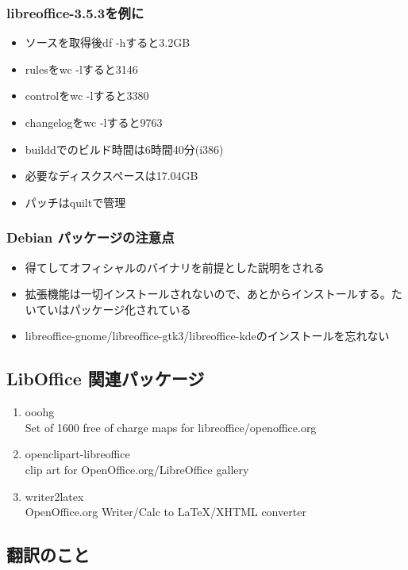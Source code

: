 \documentclass[mingoth,a4paper]{jsarticle}
\begin{document}
\subsubsection{libreoffice-3.5.3を例に}

\begin{itemize}
\item ソースを取得後df -hすると3.2GB
\item rulesをwc -lすると3146
\item controlをwc -lすると3380
\item changelogをwc -lすると9763
\item builddでのビルド時間は6時間40分(i386)
\item 必要なディスクスペースは17.04GB
\item パッチはquiltで管理
\end{itemize}

\subsubsection{Debian パッケージの注意点}

\begin{itemize}
\item 得てしてオフィシャルのバイナリを前提とした説明をされる
\item 拡張機能は一切インストールされないので、あとからインストールする。たいていはパッケージ化されている
\item libreoffice-gnome/libreoffice-gtk3/libreoffice-kdeのインストールを忘れない
\end{itemize}

\subsection{LibOffice 関連パッケージ}

\begin{enumerate}
\item ooohg \\
Set of 1600 free of charge maps for libreoffice/openoffice.org
\item openclipart-libreoffice \\
clip art for OpenOffice.org/LibreOffice gallery
\item writer2latex \\
OpenOffice.org Writer/Calc to LaTeX/XHTML converter
\end{enumerate}

\subsection{翻訳のこと}
\end{document}
